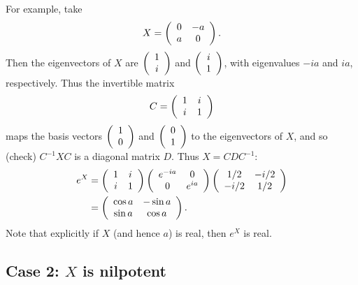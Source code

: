 \documentclass{amsbook}
\theoremstyle{plain}
\numberwithin{equation}{chapter}
\numberwithin{theorem}{chapter}
\begin{document}
For example, take
\[
X=\left(
\begin{array}
[c]{cc}%
0 & -a\\
a & 0
\end{array}
\right)  \text{.}%
\]
Then the eigenvectors of $X$ are $\left(
\begin{array}
[c]{c}%
1\\
i
\end{array}
\right)  $ and $\left(
\begin{array}
[c]{c}%
i\\
1
\end{array}
\right)  $, with eigenvalues $-ia$ and $ia$, respectively. Thus the invertible
matrix
\[
C=\left(
\begin{array}
[c]{cc}%
1 & i\\
i & 1
\end{array}
\right)
\]
maps the basis vectors $\left(
\begin{array}
[c]{c}%
1\\
0
\end{array}
\right)  $ and $\left(
\begin{array}
[c]{c}%
0\\
1
\end{array}
\right)  $ to the eigenvectors of $X$, and so (check) $C^{-1}XC$ is a diagonal
matrix $D$. Thus $X=CDC^{-1}$:
\begin{align*}
e^{X}  & =\left(
\begin{array}
[c]{cc}%
1 & i\\
i & 1
\end{array}
\right)  \left(
\begin{array}
[c]{cc}%
e^{-ia} & 0\\
0 & e^{ia}%
\end{array}
\right)  \left(
\begin{array}
[c]{cc}%
1/2 & -i/2\\
-i/2 & 1/2
\end{array}
\right) \\
& =\left(
\begin{array}
[c]{cc}%
\cos a & -\sin a\\
\sin a & \cos a
\end{array}
\right)  \text{.}%
\end{align*}
Note that explicitly if $X$ (and hence $a$) is real, then $e^{X}$ is real.

\subsection{Case 2: $X$ is nilpotent}
\end{document}
